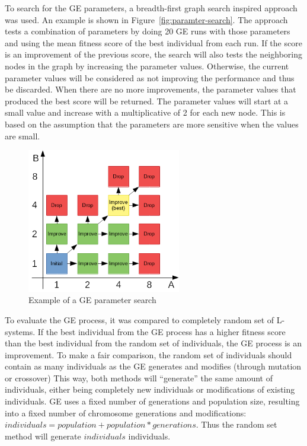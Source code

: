 To search for the GE parameters, a breadth-first graph search inspired approach was used.
An example is shown in Figure~\ref{fig:paramter-search}.
The approach tests a combination of parameters by doing 20 GE runs with those parameters and using the mean fitness score of the best individual from each run.
If the score is an improvement of the previous score, the search will also tests the neighboring nodes in the graph by increasing the parameter values.
Otherwise, the current parameter values will be considered as not improving the performance and thus be discarded.
When there are no more improvements, the parameter values that produced the best score will be returned.
The parameter values will start at a small value and increase with a multiplicative of 2 for each new node.
This is based on the assumption that the parameters are more sensitive when the values are small.

\begin{figure}
    \centering
    \includegraphics[width=0.6\textwidth]{figures/parameter-search}
    \caption{Example of a GE parameter search}
    \label{fig:parameter-search}
\end{figure}

To evaluate the GE process, it was compared to completely random set of L-systems.
If the best individual from the GE process has a higher fitness score than the best individual from the random set of individuals, the GE process is an improvement.
To make a fair comparison, the random set of individuals should contain as many individuals as the GE generates and modifies (through mutation or crossover)
This way, both methods will ``generate'' the same amount of individuals, either being completely new individuals or modifications of existing individuals.
GE uses a fixed number of generations and population size, resulting into a fixed number of chromosome generations and modifications: $individuals = population + population * generations$.
Thus the random set method will generate $individuals$ individuals.

